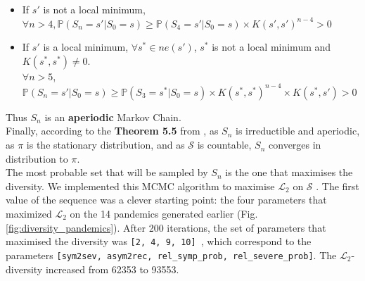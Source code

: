 \begin{itemize}
    \item If $s'$ is not a local minimum, \\
     $\forall n >4, \mathbb{P}(S_{n} = s' \vert S_0 = s) \geqslant \mathbb{P}(S_{4} = s' \vert S_0 = s) \times K(s', s')^{n-4} > 0 $ \\
    \item If $s'$ is a local minimum,  $\forall s^* \in ne(s')$, $s^*$ is not a local minimum and $K(s^*, s^*) \neq 0$. \\
    $\forall n>5$, $\mathbb{P}(S_n = s' \vert S_0 = s )   \geqslant \mathbb{P}(S_3=s^* \vert S_0 = s ) \times K(s^*, s^*)^{n-4} \times K(s^*, s') >0 $\\
    
\end{itemize}

Thus $S_n$ is an \textbf{aperiodic} Markov Chain.\\


Finally, according to the \textbf{Theorem 5.5 } from \cite*{bodineau2015modelisation}, as $S_n$ is irreductible and aperiodic, as $\pi$ is the stationary distribution, and as $\mathcal{S}$ is countable, $S_n$ converges in distribution to $\pi$.\\


The most probable set that will be sampled by $S_n$ is the one that maximises the diversity.
We implemented this MCMC algorithm to maximise $\mathcal{L}_2$ on $\mathcal{S}$ . 
The first value of the sequence was a clever starting point: the four parameters that maximized $\mathcal{L}_2$ on the 14 pandemics generated earlier (Fig.\ref{fig:diversity_pandemics}).  
After 200 iterations, the set of parameters that maximised the diversity was \texttt{[2, 4, 9, 10] }, which correspond to the parameters \texttt{[sym2sev, asym2rec, rel\_symp\_prob, rel\_severe\_prob]}. 
The $\mathcal{L}_2$- diversity increased from 62353 to 93553. \\

